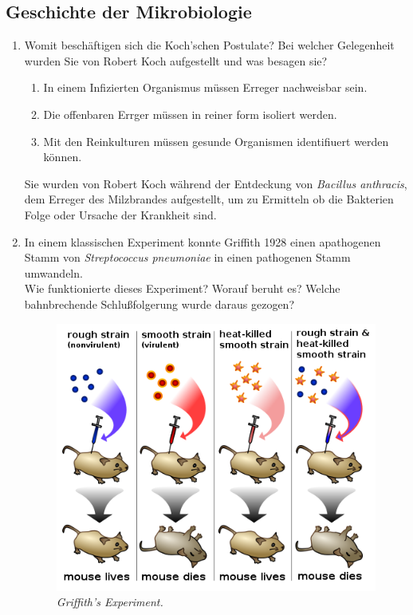 \subsection{Geschichte der Mikrobiologie}
\begin{enumerate}
	\item Womit beschäftigen sich die Koch’schen Postulate?
	Bei welcher Gelegenheit wurden Sie von Robert Koch aufgestellt und was besagen sie? \hfill \vspace{4mm}

	\begin{enumerate}[label=\arabic*)]
		\item In einem Infizierten Organismus müssen Erreger nachweisbar sein.
		\item Die offenbaren Errger müssen in reiner form isoliert werden.
		\item Mit den Reinkulturen müssen gesunde Organismen identifiuert werden können.
	\end{enumerate}
	Sie wurden von Robert Koch während der Entdeckung von \emph{Bacillus anthracis},
	dem Erreger des Milzbrandes aufgestellt,
	um zu Ermitteln ob die Bakterien Folge oder Ursache der Krankheit sind.	
	

	\item In einem klassischen Experiment konnte Griffith 1928 einen apathogenen Stamm von
	\emph{Streptococcus pneumoniae} in einen pathogenen Stamm umwandeln.\\
	Wie funktionierte dieses Experiment? Worauf beruht es? 
	Welche bahnbrechende Schlußfolgerung wurde daraus gezogen? \hfill \vspace{4mm}
	
	\begin{figure}[ht!]
	\leavevmode
	\begin{center}
	\includegraphics[scale=0.47]{./pictures/griffith_exp_500}
	\end{center}
	\caption{\slshape{Griffith's Experiment.}}
	\label{fig:griffith}
	\end{figure}


\end{enumerate}
